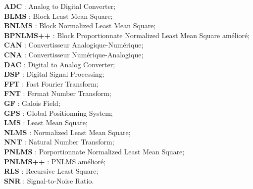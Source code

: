 
\textbf{ADC} :      Analog to Digital Converter;\\
\textbf{BLMS} :     Block Least Mean Square;\\
\textbf{BNLMS} :    Block Normalized Least Mean Square;\\
\textbf{BPNLMS++} : Block Proportionnate Normalized Least Mean Square amélioré;\\
\textbf{CAN} :      Convertisseur Analogique-Numérique;\\
\textbf{CNA} :      Convertisseur Numérique-Analogique;\\
\textbf{DAC} :      Digital to Analog Converter;\\
\textbf{DSP} :      Digital Signal Processing;\\
\textbf{FFT} :      Fast Fourier Transform;\\
\textbf{FNT} :      Fermat Number Transform;\\
\textbf{GF} :       Galois Field;\\
\textbf{GPS} :      Global Positionning System;\\
\textbf{LMS} :      Least Mean Square;\\
\textbf{NLMS} :     Normalized Least Mean Square;\\
\textbf{NNT} :      Natural Number Transform;\\
\textbf{PNLMS} :    Porportionnate Normalized Least Mean Square;\\
\textbf{PNLMS++} :  PNLMS amélioré;\\
\textbf{RLS} :      Recursive Least Square;\\
\textbf{SNR} :      Signal-to-Noise Ratio.

